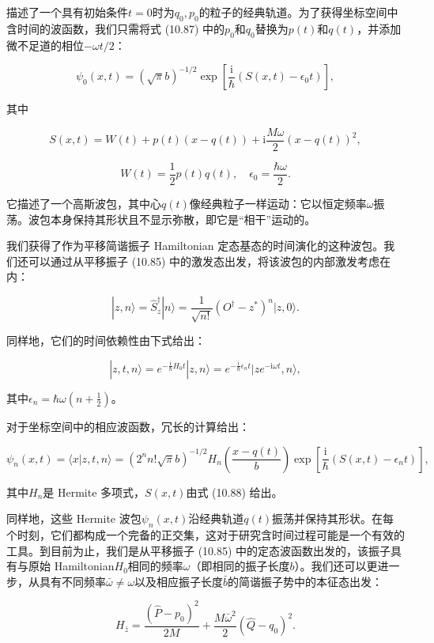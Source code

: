描述了一个具有初始条件$t=0$时为$q_{0},p_{0}$的粒子的经典轨道。为了获得坐标空间中含时间的波函数，我们只需将式
(10.87) 中的$p_{0}$和$q_{0}$替换为$p(t)$和$q(t)$，并添加微不足道的相位$-\omega t/2$：

\[
\psi_{0}(x,t)=(\sqrt{\pi}b)^{-1/2}\exp\left[\frac{\mathrm{i}}{\hbar}(S(x,t)-\epsilon_{0}t)\right],
\]

其中

\begin{equation}
S(x,t)=W(t)+p(t)(x-q(t))+\mathrm{i}\frac{M\omega}{2}(x-q(t))^{2},\label{eq:10.88}
\end{equation}

\[
W(t)=\frac{1}{2}p(t)q(t),\quad\epsilon_{0}=\frac{\hbar\omega}{2}.
\]

它描述了一个高斯波包，其中心$q(t)$像经典粒子一样运动：它以恒定频率$\omega$振荡。波包本身保持其形状且不显示弥散，即它是“相干”运动的。

我们获得了作为平移简谐振子 Hamiltonian 定态基态的时间演化的这种波包。我们还可以通过从平移振子 (10.85) 中的激发态出发，将该波包的内部激发考虑在内：

\[
|z,n\rangle=\hat{S}^{\dagger}_{z}|n\rangle=\frac{1}{\sqrt{n!}}(O^{\dagger}-z^{*})^{n}|z,0\rangle.
\]

同样地，它们的时间依赖性由下式给出：

\[
|z,t,n\rangle=e^{-\frac{\mathrm{i}}{\hbar}H_{0}t}|z,n\rangle=e^{-\frac{\mathrm{i}}{\hbar}\epsilon_{n}t}|ze^{-\mathrm{i}\omega t},n\rangle,
\]

其中$\epsilon_{n}=\hbar\omega(n+\frac{1}{2})$。

对于坐标空间中的相应波函数，冗长的计算给出：

\[
\psi_{n}(x,t)=\langle x|z,t,n\rangle=(2^{n}n!\sqrt{\pi}b)^{-1/2}H_{n}\left(\frac{x-q(t)}{b}\right)\exp\left[\frac{\mathrm{i}}{\hbar}(S(x,t)-\epsilon_{n}t)\right],
\]

其中$H_{n}$是 Hermite 多项式，$S(x,t)$由式 (10.88) 给出。

同样地，这些 Hermite 波包$\psi_{n}(x,t)$沿经典轨道$q(t)$振荡并保持其形状。在每个时刻，它们都构成一个完备的正交集，这对于研究含时间过程可能是一个有效的工具。到目前为止，我们是从平移振子
(10.85) 中的定态波函数出发的，该振子具有与原始 Hamiltonian$H_{0}$相同的频率$\omega$（即相同的振子长度$b$）。我们还可以更进一步，从具有不同频率$\bar{\omega}\neq\omega$以及相应振子长度$\bar{b}$的简谐振子势中的本征态出发：

\[
H_{\bar{z}}=\frac{(\hat{P}-p_{0})^{2}}{2M}+\frac{M\bar{\omega}^{2}}{2}(\hat{Q}-q_{0})^{2}.
\]

